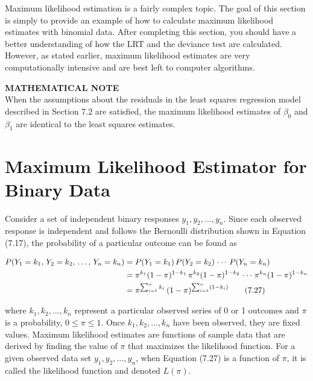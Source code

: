 \documentclass[
]{report}
\begin{document}
Maximum likelihood estimation is a fairly complex topic. The goal of this section is simply to provide an example of how to calculate maximum likelihood estimates with binomial data. After completing this section, you should have a better understanding of how the LRT and the deviance test are calculated. However, as stated earlier, maximum likelihood estimates are very computationally intensive and are best left to computer algorithms.

\large

\textbf{MATHEMATICAL NOTE}\\
When the assumptions about the residuals in the least squares regression model described in Section 7.2 are satisfied, the maximum likelihood estimates of \(\beta_0\) and \(\beta_1\) are identical to the least squares estimates.\\
\normalsize

\section*{Maximum Likelihood Estimator for Binary Data}\label{maximum-likelihood-estimator-for-binary-data}

Consider a set of independent binary responses \(y_1, y_2, \dots, y_n\). Since each observed response is independent and follows the Bernoulli distribution shown in Equation (7.17), the probability of a particular outcome can be found as

\begin{align}
P(Y_1 = k_1,\,Y_2 = k_2,\,\dots,\,Y_n = k_n) 
&= P(Y_1 = k_1)\,P(Y_2 = k_2)\,\cdots\,P(Y_n = k_n) \notag \\
&= \pi^{k_1}(1 - \pi)^{1-k_1}\,\pi^{k_2}(1 - \pi)^{1-k_2}\,\cdots\,\pi^{k_n}(1 - \pi)^{1-k_n} \notag \\
&= \pi^{\sum_{i=1}^n k_i}\,(1 - \pi)^{\sum_{i=1}^n (1 - k_i)}
\tag{7.27}
\end{align}

where \(k_1, k_2, \dots, k_n\) represent a particular observed series of 0 or 1 outcomes and \(\pi\) is a probability, \(0 \le \pi \le 1\). Once \(k_1, k_2, \dots, k_n\) have been observed, they are fixed values. Maximum likelihood estimates are functions of sample data that are derived by finding the value of \(\pi\) that maximizes the likelihood function. For a given observed data set \(y_1, y_2, \dots, y_n\), when Equation (7.27) is a function of \(\pi\), it is called the likelihood function and denoted \(L(\pi)\).
\end{document}
